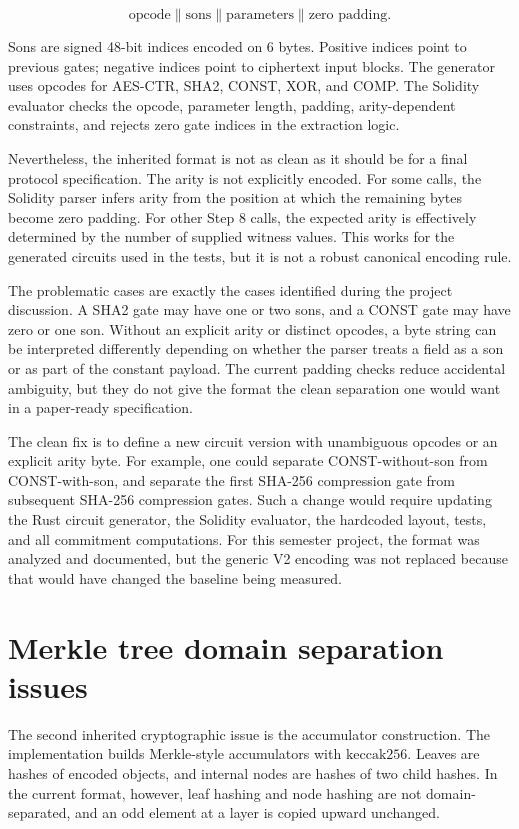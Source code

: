 \[
  \text{opcode} \parallel \text{sons} \parallel \text{parameters}
  \parallel \text{zero padding}.
\]

Sons are signed 48-bit indices encoded on 6 bytes. Positive indices point to previous gates;
negative indices point to ciphertext input blocks. The generator uses opcodes for AES-CTR,
SHA2, CONST, XOR, and COMP. The Solidity evaluator checks the opcode, parameter length,
padding, arity-dependent constraints, and rejects zero gate indices in the extraction logic.

Nevertheless, the inherited format is not as clean as it should be for a final protocol
specification. The arity is not explicitly encoded. For some calls, the Solidity parser
infers arity from the position at which the remaining bytes become zero padding. For other
Step 8 calls, the expected arity is effectively determined by the number of supplied witness
values. This works for the generated circuits used in the tests, but it is not a robust
canonical encoding rule.

The problematic cases are exactly the cases identified during the project discussion. A
SHA2 gate may have one or two sons, and a CONST gate may have zero or one son. Without an
explicit arity or distinct opcodes, a byte string can be interpreted differently depending
on whether the parser treats a field as a son or as part of the constant payload. The current
padding checks reduce accidental ambiguity, but they do not give the format the clean
separation one would want in a paper-ready specification.

The clean fix is to define a new circuit version with unambiguous opcodes or an explicit
arity byte. For example, one could separate CONST-without-son from CONST-with-son, and
separate the first SHA-256 compression gate from subsequent SHA-256 compression gates. Such
a change would require updating the Rust circuit generator, the Solidity evaluator, the
hardcoded layout, tests, and all commitment computations. For this semester project, the
format was analyzed and documented, but the generic V2 encoding was not replaced because
that would have changed the baseline being measured.

\section{Merkle tree domain separation issues}

The second inherited cryptographic issue is the accumulator construction. The implementation
builds Merkle-style accumulators with \(\mathrm{keccak256}\). Leaves are hashes of encoded
objects, and internal nodes are hashes of two child hashes. In the current format, however,
leaf hashing and node hashing are not domain-separated, and an odd element at a layer is
copied upward unchanged.

